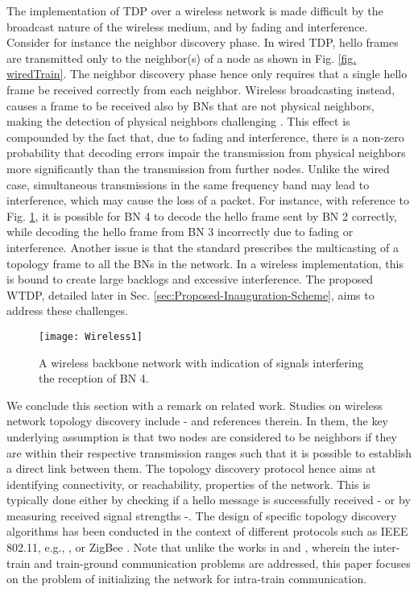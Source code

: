 \documentclass[10pt,english,two column]{IEEEtran}
\begin{document}
The implementation of TDP \cite{IEC 61375} over a wireless network
is made difficult by the broadcast nature of the wireless medium,
and by fading and interference. Consider for instance the neighbor
discovery phase. In wired TDP, hello frames are transmitted only to
the neighbor(s) of a node as shown in Fig. \ref{fig. wiredTrain}.
The neighbor discovery phase hence only requires that a single hello
frame be received correctly from each neighbor. Wireless broadcasting
instead, causes a frame to be received also by BNs that are not physical
neighbors, making the detection of physical neighbors challenging
\cite{Zeng}. This effect is compounded by the fact that, due to fading
and interference, there is a non-zero probability that decoding errors
impair the transmission from physical neighbors more significantly
than the transmission from further nodes. Unlike the wired case, simultaneous
transmissions in the same frequency band may lead to interference,
which may cause the loss of a packet. For instance, with reference
to Fig. \ref{fig. Wireless1}, it is possible for BN 4 to decode the
hello frame sent by BN 2 correctly, while decoding the hello frame
from BN 3 incorrectly due to fading or interference. Another issue
is that the standard \cite{IEC 61375} prescribes the multicasting
of a topology frame to all the BNs in the network. In a wireless implementation,
this is bound to create large backlogs and excessive interference.
The proposed WTDP, detailed later in Sec. \ref{sec:Proposed-Inauguration-Scheme},
aims to address these challenges. 
\begin{figure}[htbp]
\begin{centering}
\textsf{\texttt{[image: Wireless1]}}
\par\end{centering}

\caption{\label{fig. Wireless1}A wireless backbone network with indication
of signals interfering the reception of BN 4.}
\end{figure}


We conclude this section with a remark on related work. Studies on
wireless network topology discovery include \cite{Zeng}-\cite{MZhang}
and references therein. In them, the key underlying assumption is
that two nodes are considered to be neighbors if they are within their
respective transmission ranges such that it is possible to establish
a direct link between them. The topology discovery protocol hence
aims at identifying connectivity, or reachability, properties of the
network. This is typically done either by checking if a hello message
is successfully received \cite{Zeng}-\cite{LiuX} or by measuring
received signal strengths \cite{IJawhar}-\cite{MZhang}. The design
of specific topology discovery algorithms has been conducted in the
context of different protocols such as IEEE 802.11, e.g., \cite{Hermann},
or ZigBee \cite{HXie}. Note that unlike the works in \cite{B-ning-1}
and \cite{B-ning-2}, wherein the inter-train and train-ground communication
problems are addressed, this paper focuses on the problem of initializing
the network for intra-train communication. 
\end{document}
